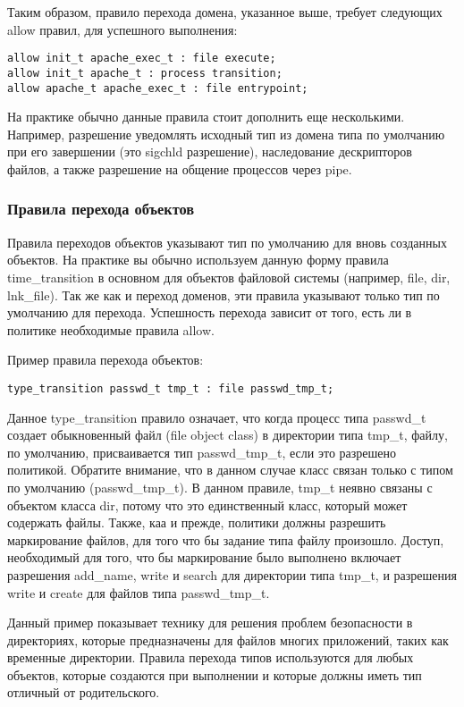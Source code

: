 \documentclass{./../class/UIR}
\begin{document}
Таким образом, правило перехода домена, указанное выше, требует следующих allow
правил, для успешного выполнения:
\begin{verbatim}
allow init_t apache_exec_t : file execute;
allow init_t apache_t : process transition;
allow apache_t apache_exec_t : file entrypoint;
\end{verbatim}
На практике обычно данные правила стоит дополнить еще несколькими. Например,
разрешение уведомлять исходный тип из домена типа по умолчанию при его
завершении (это sigchld разрешение), наследование дескрипторов файлов, а также
разрешение на общение процессов через pipe.

\subsubsection{Правила перехода объектов}

Правила переходов объектов указывают тип по умолчанию для вновь созданных
объектов. На практике вы обычно используем данную форму правила time\_transition
в основном для объектов файловой системы (например, file, dir, lnk\_file). Так
же как и переход доменов, эти правила указывают только тип по умолчанию для
перехода. Успешность перехода зависит от того, есть ли в политике необходимые
правила allow.

Пример правила перехода объектов:
\begin{verbatim}
type_transition passwd_t tmp_t : file passwd_tmp_t;
\end{verbatim}
Данное type\_transition правило означает, что когда процесс типа passwd\_t
создает обыкновенный файл (file object class) в директории типа tmp\_t, файлу,
по умолчанию, присваивается тип passwd\_tmp\_t, если это разрешено политикой.
Обратите внимание, что в данном случае класс связан только с типом по умолчанию
(passwd\_tmp\_t). В данном правиле, tmp\_t неявно связаны с объектом класса dir,
потому что это единственный класс, который может содержать файлы. Также, каа и
прежде, политики должны разрешить маркирование файлов, для того что бы задание
типа файлу произошло. Доступ, необходимый для того, что бы маркирование было
выполнено включает разрешения add\_name, write и search для директории типа
tmp\_t, и разрешения write и create для файлов типа passwd\_tmp\_t.

Данный пример показывает технику для решения проблем безопасности в директориях,
которые предназначены для файлов многих приложений, таких как временные
директории. Правила перехода типов используются для любых объектов, которые
создаются при выполнении и которые должны иметь тип отличный от родительского.
\end{document}
